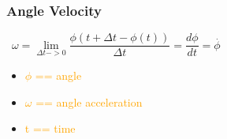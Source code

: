 \documentclass[main.tex,fontsize=8pt,paper=a4,paper=portrait,DIV=calc,]{scrartcl}
\begin{document}
\begin{multicols*}{2}
\subsubsection{Angle Velocity}
\, \newline
\large \( \omega = \underset{\Delta t -> 0}{\lim} \dfrac{\phi(t + \Delta t - \phi(t))}{\Delta t} = \dfrac{d\phi}{dt} = \overset{.}{\phi} \) \newline
\, \newline \normalsize
\begin{itemize}
\item \textcolor{orange}{\(\phi\) == angle}
\item \textcolor{orange}{\(\omega\) == angle acceleration}
\item \textcolor{orange}{ t == time}

\end{itemize}


\end{multicols*}
\end{document}
